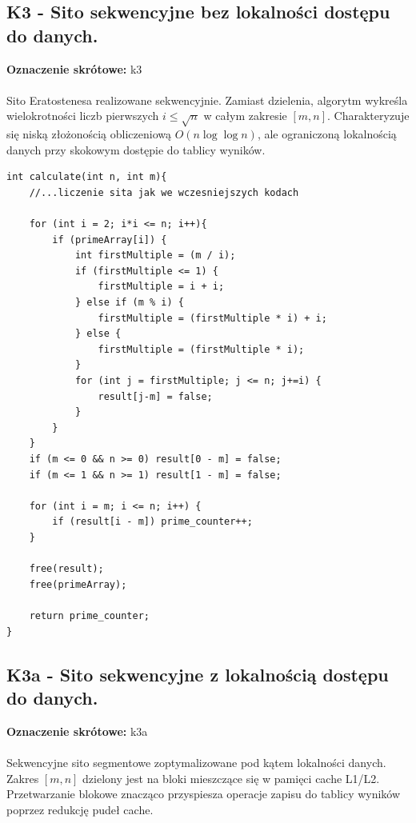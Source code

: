 \documentclass[10pt]{article}
\begin{document}
\newpage

\subsection*{K3 - Sito sekwencyjne bez lokalności dostępu do danych.}
\textbf{Oznaczenie skrótowe:} k3
\\ \\
Sito Eratostenesa realizowane sekwencyjnie. Zamiast dzielenia, algorytm wykreśla wielokrotności liczb pierwszych $i \le \sqrt{n}$ w całym zakresie $[m, n]$. 
Charakteryzuje się niską złożonością obliczeniową $O(n \log \log n)$, ale ograniczoną lokalnością danych przy skokowym dostępie do tablicy wyników.
\\

\begin{lstlisting}[style=mystyle, caption={Kod programu k3.cpp}, label={lst:k3}]
int calculate(int n, int m){
	//...liczenie sita jak we wczesniejszych kodach 

	for (int i = 2; i*i <= n; i++){
		if (primeArray[i]) {
			int firstMultiple = (m / i);
			if (firstMultiple <= 1) {
				firstMultiple = i + i;
			} else if (m % i) { 
				firstMultiple = (firstMultiple * i) + i;
			} else {
				firstMultiple = (firstMultiple * i);
			}
			for (int j = firstMultiple; j <= n; j+=i) { 
				result[j-m] = false;
			}
		}
	}
	if (m <= 0 && n >= 0) result[0 - m] = false;
	if (m <= 1 && n >= 1) result[1 - m] = false;

	for (int i = m; i <= n; i++) {
    	if (result[i - m]) prime_counter++;
	}

	free(result);
	free(primeArray);
	
	return prime_counter;
}
\end{lstlisting}

\newpage
\subsection*{K3a - Sito sekwencyjne z lokalnością dostępu do danych.}
\textbf{Oznaczenie skrótowe:} k3a
\\ \\ 
Sekwencyjne sito segmentowe zoptymalizowane pod kątem lokalności danych. Zakres $[m, n]$ dzielony jest na bloki mieszczące się w pamięci cache L1/L2.
Przetwarzanie blokowe znacząco przyspiesza operacje zapisu do tablicy wyników poprzez redukcję pudeł cache.
\\
\end{document}
